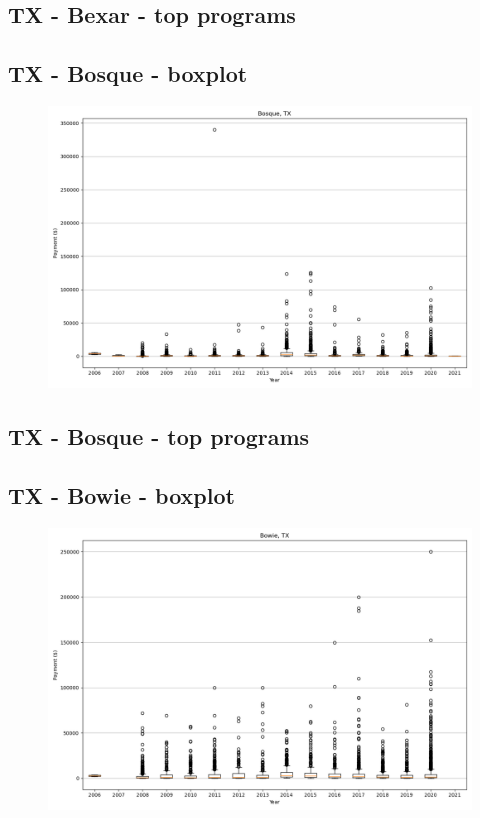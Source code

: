 \subsection*{TX - Bexar - top programs}

\newpage
\subsection*{TX - Bosque - boxplot}
\begin{figure}[h]
\centering
\includegraphics[width=7in]{../output/boxplots/counties/Bosque-TX_boxplot.png}
\end{figure}


\subsection*{TX - Bosque - top programs}

\newpage
\subsection*{TX - Bowie - boxplot}
\begin{figure}[h]
\centering
\includegraphics[width=7in]{../output/boxplots/counties/Bowie-TX_boxplot.png}
\end{figure}


